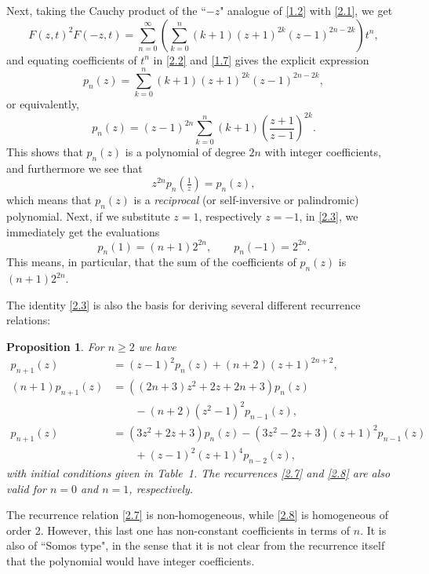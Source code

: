 \documentclass{amsart}
\theoremstyle{plain}
\newtheorem{proposition}[theorem]{Proposition}
\numberwithin{equation}{section}
\begin{document}
Next, taking the Cauchy product of the ``$-z$" analogue of 
\eqref{1.2} with \eqref{2.1}, we get
\begin{equation}\label{2.2}
F(z,t)^2F(-z,t)=\sum_{n=0}^\infty
\left(\sum_{k=0}^n(k+1)(z+1)^{2k}(z-1)^{2n-2k}\right)t^n,
\end{equation}
and equating coefficients of $t^n$ in \eqref{2.2} and \eqref{1.7} gives the
explicit expression
\begin{equation}\label{2.3}
p_n(z) = \sum_{k=0}^n(k+1)(z+1)^{2k}(z-1)^{2n-2k},
\end{equation}
or equivalently,
\begin{equation}\label{2.4}
p_n(z) = (z-1)^{2n}\sum_{k=0}^n(k+1)\left(\frac{z+1}{z-1}\right)^{2k}.
\end{equation}
This shows that $p_n(z)$ is a polynomial of degree $2n$ with integer 
coefficients, and furthermore we see that
\begin{equation}\label{2.5}
z^{2n}p_n(\tfrac{1}{z}) = p_n(z), 
\end{equation}
which means that $p_n(z)$ is a {\it reciprocal} (or self-inversive or 
palindromic) polynomial.
Next, if we substitute $z=1$, respectively $z=-1$, in \eqref{2.3}, we 
immediately get the evaluations
\begin{equation}\label{2.6}
p_n(1) = (n+1)2^{2n},\qquad p_n(-1) = 2^{2n}.
\end{equation}
This means, in particular, that the sum of the coefficients of $p_n(z)$ is
$(n+1)2^{2n}$. 

The identity \eqref{2.3} is also the basis for deriving several different
recurrence relations:

\begin{proposition}\label{prop:2.1}
For $n\geq 2$ we have
\begin{align}
p_{n+1}(z) &= (z-1)^2p_n(z) + (n+2)(z+1)^{2n+2},\label{2.7}\\
(n+1)p_{n+1}(z) &= \left((2n+3)z^2+2z+2n+3\right)p_n(z) \label{2.8}\\
&\qquad -(n+2)(z^2-1)^2p_{n-1}(z),\nonumber\\
p_{n+1}(z) &= (3z^2+2z+3)p_n(z)-(3z^2-2z+3)(z+1)^2p_{n-1}(z)\label{2.9}\\
&\qquad+(z-1)^2(z+1)^4p_{n-2}(z),\nonumber
\end{align}
with initial conditions given in Table~1. The recurrences \eqref{2.7} and 
\eqref{2.8} are also valid for $n=0$ and $n=1$, respectively.
\end{proposition}

The recurrence relation \eqref{2.7} is non-homogeneous, while \eqref{2.8} is
homogeneous of order 2. However, this last one has non-constant coefficients in
terms of $n$. It is also of ``Somos type", in the sense that it is not clear
from the recurrence itself that the polynomial would have integer coefficients.
\end{document}
